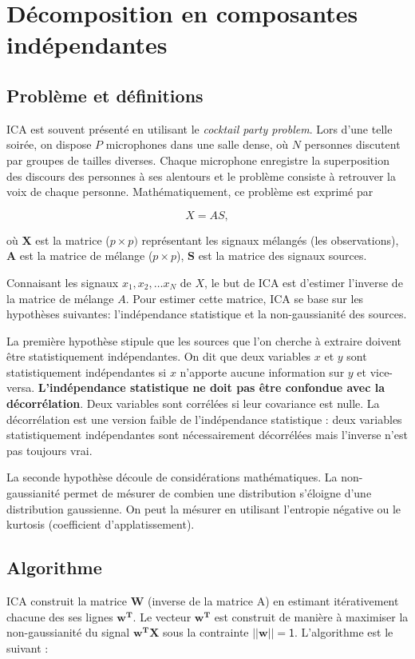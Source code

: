 \documentclass[11pt, openany]{report}
\begin{document}
\section{Décomposition en composantes indépendantes}
\subsection{Problème et définitions}
ICA est souvent présenté en utilisant le \textit{cocktail party problem}. Lors d'une telle soirée, on dispose $P$ microphones dans une salle dense, où $N$ personnes discutent par groupes de tailles diverses. Chaque microphone enregistre la superposition des discours des personnes à ses alentours et le problème consiste à retrouver la voix de chaque personne. Mathématiquement, ce problème est exprimé par 

\[ X = A S, \]

où $\textbf{X}$ est la matrice ($p\times p)$ représentant les signaux mélangés (les observations),
$\textbf{A}$ est la matrice de mélange ($p \times p$), $\textbf{S}$ est la matrice des signaux sources.

Connaisant les signaux $x_{1}, x_{2},\ldots x_{N}$ de $X$, le but de ICA est d'estimer l'inverse de la matrice de mélange $A$. Pour estimer cette matrice, ICA se base sur les hypothèses suivantes: l'indépendance statistique et la non-gaussianité des sources.

La première hypothèse stipule que les sources que l'on cherche à extraire doivent être statistiquement indépendantes. On dit que deux variables $x$ et $y$ sont statistiquement indépendantes si $x$ n'apporte aucune information sur $y$ et vice-versa. \textbf{L'indépendance statistique ne doit pas être confondue avec la décorrélation}. Deux variables sont corrélées si leur covariance est nulle. La décorrélation est une version faible de l'indépendance statistique : deux variables statistiquement indépendantes sont nécessairement décorrélées mais l'inverse n'est pas toujours vrai.

La seconde hypothèse découle de considérations mathématiques. La non-gaussianité permet de mésurer de combien une distribution s'éloigne d'une distribution gaussienne. On peut la mésurer en utilisant l'entropie négative ou le kurtosis (coefficient d'applatissement). 
\subsection{Algorithme}
ICA construit la matrice $\boldsymbol{W}$ (inverse de la matrice A) en estimant itérativement chacune des ses lignes $\boldsymbol{w^T}$. Le vecteur $\boldsymbol{w^T}$ est construit de manière à maximiser la non-gaussianité du signal $\boldsymbol{w^TX}$ sous la contrainte $||\boldsymbol{w}||=\mathsf{1}$. L'algorithme est le suivant :
\end{document}
